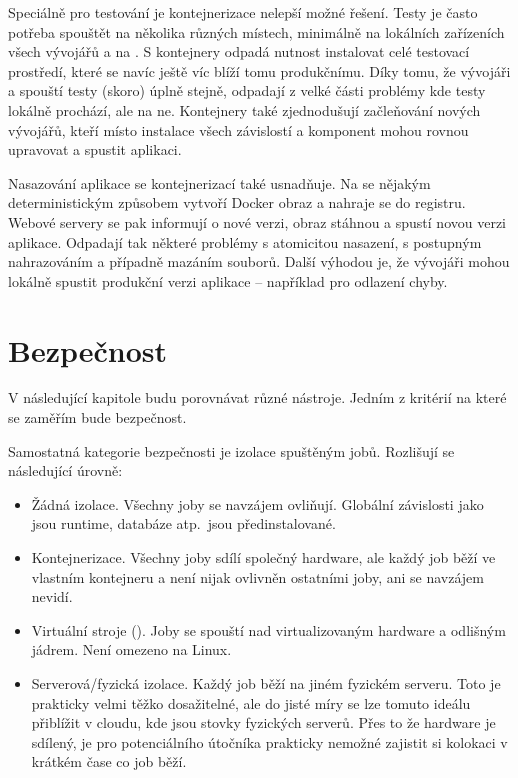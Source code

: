
        Speciálně pro testování je kontejnerizace nelepší možné řešení. Testy je často potřeba spouštět na několika různých místech, minimálně na lokálních zařízeních všech vývojářů a na \CI. S kontejnery odpadá nutnost instalovat celé testovací prostředí, které se navíc ještě víc blíží tomu produkčnímu. Díky tomu, že vývojáři a \CI spouští testy (skoro) úplně stejně, odpadají z velké části problémy kde testy lokálně prochází, ale na \CI ne. Kontejnery také zjednodušují začleňování nových vývojářů, kteří místo instalace všech závislostí a komponent mohou rovnou upravovat a spustit aplikaci.

        Nasazování aplikace se kontejnerizací také usnadňuje. Na \CI se nějakým deterministickým způsobem vytvoří Docker obraz a nahraje se do registru. Webové servery se pak informují o nové verzi, obraz stáhnou a spustí novou verzi aplikace. Odpadají tak některé problémy s atomicitou nasazení, s postupným nahrazováním a případně mazáním souborů. Další výhodou je, že vývojáři mohou lokálně spustit produkční verzi aplikace -- například pro odlazení chyby.

    \section{Bezpečnost}
        V následující kapitole budu porovnávat různé \CI nástroje. Jedním z kritérií na které se zaměřím bude bezpečnost.
        \blind[1]

        Samostatná kategorie bezpečnosti \CI je izolace spuštěným jobů. Rozlišují se následující úrovně:
        \begin{itemize}
            \item Žádná izolace. Všechny joby se navzájem ovliňují. Globální závislosti jako jsou runtime, databáze atp.~jsou předinstalované.
            \item Kontejnerizace. Všechny joby sdílí společný hardware, ale každý job běží ve vlastním kontejneru a není nijak ovlivněn ostatními joby, ani se navzájem nevidí.
            \item Virtuální stroje (). Joby se spouští nad virtualizovaným hardware a odlišným jádrem. Není omezeno na Linux.
            \item Serverová/fyzická izolace. Každý job běží na jiném fyzickém serveru. Toto je prakticky velmi těžko dosažitelné, ale do jisté míry se lze tomuto ideálu přiblížit v cloudu, kde jsou stovky fyzických serverů. Přes to že hardware je sdílený, je pro potenciálního útočníka prakticky nemožné zajistit si kolokaci v krátkém čase co job běží.
        \end{itemize}

